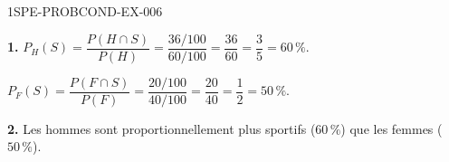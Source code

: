 \begin{corrige}{1SPE-PROBCOND-EX-006}

\textbf{1.} $P_H(S) = \dfrac{P(H \cap S)}{P(H)} = \dfrac{36/100}{60/100} = \dfrac{36}{60} = \dfrac{3}{5} = 60\,\%$.

$P_F(S) = \dfrac{P(F \cap S)}{P(F)} = \dfrac{20/100}{40/100} = \dfrac{20}{40} = \dfrac{1}{2} = 50\,\%$.

\medskip
\textbf{2.} Les hommes sont proportionnellement plus sportifs ($60\,\%$) que les femmes ($50\,\%$).

\end{corrige}
